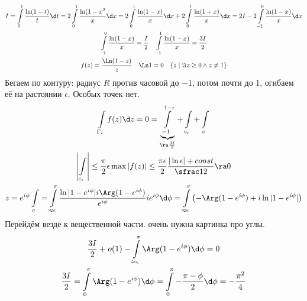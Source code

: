 \begin{exmp}
	\begin{gather*}
		I = \int\limits_0^1 \frac{\ln(1-t)}t \d t
		= 2 \int\limits_0^1 \frac{\ln(1-x^2}x \d x
		= 2 \int\limits_0^1 \frac{\ln(1-x)}x \d x + 2\int\limits_0^1 \frac{\ln(1+x)}x \d x
		= 2I - 2\int\limits_{-1}^0 \frac{\ln(1-x)}x \d x \\
		\int\limits_{-1}^0 \frac{\ln(1-x)}x = \frac I2 \quad \int\limits_{-1}^1 \frac{\ln(1-x)}x = \frac{3I}2 \\
		f(z) = \frac{\Ln(1 - z)}z \quad \Ln 1 = 0 \quad \{z \mid \Im z \ge 0 \land z \ne 1\}
	\end{gather*}
	Бегаем по контуру: радиус $R$ против часовой до $-1$, потом почти до 1, огибаем её на растоянии $\epsilon$.
	Особых точек нет.
	\begin{gather*}
		\int\limits_{\Gamma_\epsilon} f(z) \d z = 0
		= \underbrace{\int\limits_{-1}^{1-\epsilon}}_{\ra \frac{3I}2} + \int\limits_{c_\epsilon} + \int\limits_c \\
		\left| \int\limits_{c_\epsilon} \right| \le \frac{\pi}2 \epsilon \max |f(z)| \le \frac{\pi\epsilon}2 \frac{|\ln \epsilon| + const}{\sfrac12} \ra 0 \\
		z = e^{i\phi}
		\int\limits_c = \int\limits_{\approx\epsilon}^\pi \frac{\ln |1-e^{i\phi}| i\Arg(1-e^{i\phi})}{e^{i\phi}} ie^{i\phi} \d \phi
		= \int\limits_{\approx\epsilon}^\pi \left(-\Arg(1-e^{i\phi}) + i\ln|1-e^{i\phi}|\right)
	\end{gather*}
	Перейдём везде к вещественной части. \TODO очень нужна картинка про углы.
	\begin{gather*}
		\frac{3I}2 + o(1) - \int\limits_{\approx\epsilon}^\pi \Arg (1 - e^{i\phi}) \d \phi = 0 \\
		\frac{3I}2 = \int\limits_{0}^\pi \Arg(1 - e^{i\phi}) \d \phi = \int\limits_0^\pi -\frac{\pi - \phi}2 \d \phi
		= -\frac{\pi^2}4
	\end{gather*}
\end{exmp}
